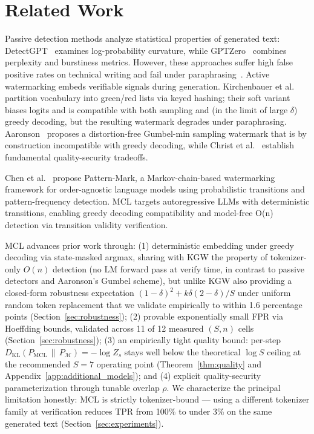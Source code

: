 \documentclass[11pt]{article}
\theoremstyle{definition}
\theoremstyle{remark}
\begin{document}
\section{Related Work}

Passive detection methods analyze statistical properties of generated text: DetectGPT~\cite{mitchell2023detectgpt} examines log-probability curvature, while GPTZero~\cite{tian2023gptzero} combines perplexity and burstiness metrics. However, these approaches suffer high false positive rates on technical writing and fail under paraphrasing~\cite{krishna2023paraphrasing,sadasivan2023can}. Active watermarking embeds verifiable signals during generation. Kirchenbauer et al.~\cite{kirchenbauer2023watermark} partition vocabulary into green/red lists via keyed hashing; their soft variant biases logits and is compatible with both sampling and (in the limit of large $\delta$) greedy decoding, but the resulting watermark degrades under paraphrasing. Aaronson~\cite{aaronson2023semstamp} proposes a distortion-free Gumbel-min sampling watermark that is by construction incompatible with greedy decoding, while Christ et al.~\cite{christ2024undetectable} establish fundamental quality-security tradeoffs.

Chen et al.~\cite{chen2024watermarkorderagnosticlanguagemodel} propose Pattern-Mark, a Markov-chain-based watermarking framework for order-agnostic language models using probabilistic transitions and pattern-frequency detection. MCL targets autoregressive LLMs with 
deterministic transitions, enabling greedy decoding compatibility and model-free O(n) detection via transition validity verification.

MCL advances prior work through: (1) deterministic embedding under greedy decoding via state-masked argmax, sharing with KGW the property of tokenizer-only $O(n)$ detection (no LM forward pass at verify time, in contrast to passive detectors and Aaronson's Gumbel scheme), but unlike KGW also providing a closed-form robustness expectation $(1-\delta)^2 + k\delta(2-\delta)/S$ under uniform random token replacement that we validate empirically to within 1.6 percentage points (Section~\ref{sec:robustness}); (2) provable exponentially small FPR via Hoeffding bounds, validated across 11 of 12 measured $(S, n)$ cells (Section~\ref{sec:robustness}); (3) an empirically tight quality bound: per-step $D_{\mathrm{KL}}(P_{\mathrm{MCL}} \,\|\, P_{\mathcal{M}}) = -\log Z_s$ stays well below the theoretical $\log S$ ceiling at the recommended $S=7$ operating point (Theorem~\ref{thm:quality} and Appendix~\ref{app:additional_models}); and (4) explicit quality-security parameterization through tunable overlap $\rho$. We characterize the principal limitation honestly: MCL is strictly tokenizer-bound — using a different tokenizer family at verification reduces TPR from 100\% to under 3\% on the same generated text (Section~\ref{sec:experiments}).
\end{document}
